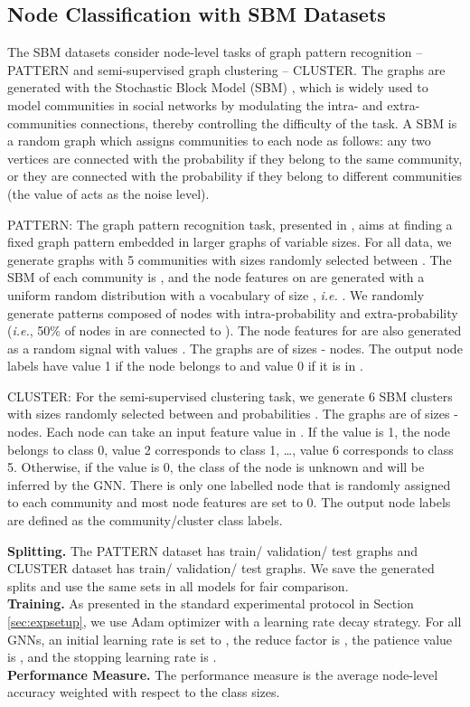 \documentclass{article}
\begin{document}
\subsection{Node Classification with SBM Datasets}
The SBM datasets consider node-level tasks of graph pattern recognition \cite{art:ScarselliGoriTsoiHagenbuchnerMonfardini09} -- PATTERN and semi-supervised graph clustering -- CLUSTER. 
The graphs are generated with the Stochastic Block Model (SBM) \cite{abbe2017community}, which is widely used to model communities in social networks by modulating the intra- and extra-communities connections, thereby controlling the difficulty of the task.
A SBM is a random graph which assigns communities to each node as follows: any two vertices are connected with the probability  if they belong to the same community, or they are connected with the probability  if they belong to different communities (the value of  acts as the noise level).



PATTERN: The graph pattern recognition task, presented in \cite{art:ScarselliGoriTsoiHagenbuchnerMonfardini09}, aims at finding a fixed graph pattern  embedded in larger graphs  of variable sizes.
For all data, we generate graphs  with 5 communities with sizes randomly selected between . 
The SBM of each community is , and the node features on  are generated with a uniform random distribution with a vocabulary of size , \textit{i.e.} . 
We randomly generate  patterns  composed of  nodes with intra-probability  and extra-probability  (\textit{i.e.}, 50\% of nodes in  are connected to ). 
The node features for  are also generated as a random signal with values . 
The graphs are of sizes - nodes. 
The output node labels have value 1 if the node belongs to  and value 0 if it is in . 

CLUSTER: For the semi-supervised clustering task, we generate 6 SBM clusters with sizes randomly selected between  and probabilities . 
The graphs are of sizes - nodes. 
Each node can take an input feature value in . If the value is 1, the node belongs to class 0, value 2 corresponds to class 1, \dots, value 6 corresponds to class 5. 
Otherwise, if the value is 0, the class of the node is unknown and will be inferred by the GNN. 
There is only one labelled node that is randomly assigned to each community and most node features are set to 0.
The output node labels are defined as the community/cluster class labels.

{\bf Splitting.} The PATTERN dataset has  train/ validation/ test graphs and CLUSTER dataset has  train/ validation/ test graphs. We save the generated splits and use the same sets in all models for fair comparison.\\
{\bf Training.} As presented in the standard experimental protocol in Section \ref{sec:expsetup}, we use Adam optimizer with a learning rate decay strategy. For all GNNs, an initial learning rate is set to , the reduce factor is , the patience value is , and the stopping learning rate is . \\
{\bf Performance Measure.} The performance measure is the average node-level accuracy weighted with respect to the class sizes.
\end{document}
